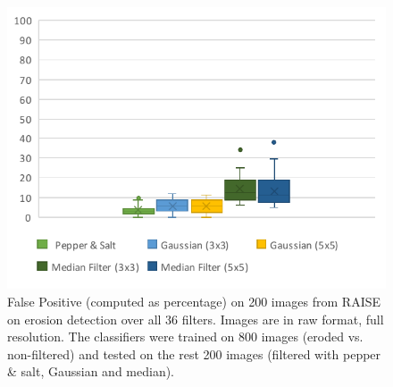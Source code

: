 \documentclass{ieeeaccess}
\begin{document}
\begin{figure}[t!]
	\centering
	\includegraphics[width=\linewidth]{different_filters.pdf}
	\caption{False Positive (computed as percentage) on 200 images from RAISE on erosion detection over all 36 filters. Images are in raw format, full resolution. The classifiers were trained on 800 images (eroded vs. non-filtered) and tested on the rest 200 images (filtered with pepper \& salt, Gaussian and median).}
	\label{fig:different_filters}
\end{figure}



\end{document}
